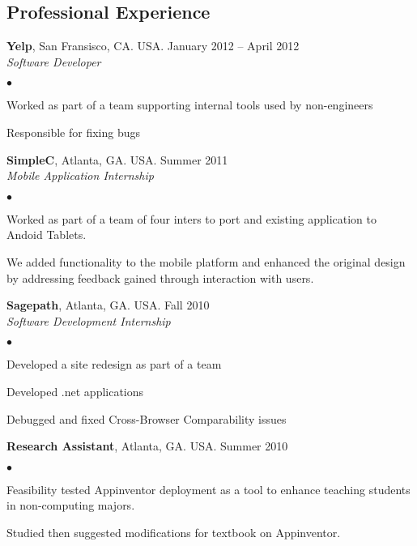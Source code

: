 \documentclass[margin,line]{res}
\newenvironment{list2}{
  \begin{list}{$\bullet$}{%
      \setlength{\itemsep}{0in}
      \setlength{\parsep}{0in} \setlength{\parskip}{0in}
      \setlength{\topsep}{0in} \setlength{\partopsep}{0in}
      \setlength{\leftmargin}{0.2in}}}{\end{list}}
\begin{document}
\begin{resume}
\section{\sc Professional Experience}
{\bf Yelp}, San Fransisco, CA. USA. \hfill{January 2012 -- April 2012}\\
{\em Software Developer}\hfill\\
    \begin{list2} %
    \item Worked as part of a team supporting internal tools used by
      non-engineers \\
    \item Responsible for fixing bugs \\
\end{list2}
{\bf SimpleC}, Atlanta, GA. USA. \hfill{Summer 2011}\\
{\em Mobile Application Internship} \\
\begin{list2} %
    \item Worked as part of a team of four inters to port and existing
      application to Andoid Tablets. \\
    \item We added functionality to the mobile platform and enhanced the
      original design by addressing feedback gained through interaction
      with users.\\
\end{list2}
{\bf Sagepath}, Atlanta, GA. USA. \hfill{Fall 2010}\\
{\em Software Development Internship} \\
\begin{list2} %
    \item Developed a site redesign as part of a team \\
    \item Developed .net applications \\
    \item Debugged and fixed Cross-Browser Comparability issues \\
\end{list2}
{\bf Research Assistant}, Atlanta, GA. USA. \hfill{Summer 2010}\\
\begin{list2} %
    \item Feasibility tested Appinventor deployment as a tool to
      enhance teaching students in non-computing majors.
    \item Studied then suggested modifications for textbook on Appinventor.\\
\end{list2}

\end{resume}
\end{document}
